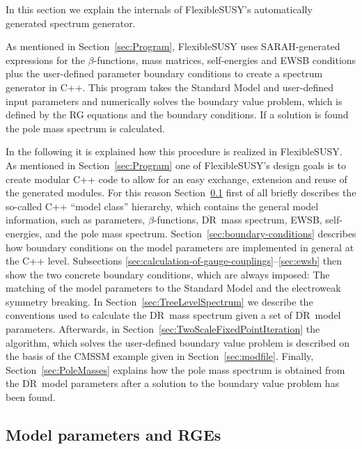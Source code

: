 \documentclass[final,3p,11pt,pdflatex]{elsarticle}
\makeatletter
\newcommand{\fs}{FlexibleSUSY\@\xspace}
\newcommand{\textoverline}[1]{$\overline{\mbox{#1}}$}
\newcommand{\DRbar}{\textoverline{DR}\xspace}
\newcommand{\secref}[1]{Section~\ref{#1}}
\makeatother
\begin{document}
In this section we explain the internals of \fs's automatically
generated spectrum generator.

As mentioned in \secref{sec:Program}, \fs uses SARAH-generated
expressions for the $\beta$-functions, mass matrices, self-energies
and EWSB conditions plus the user-defined parameter boundary
conditions to create a spectrum generator in C++.  This program takes
the Standard Model and user-defined input parameters and numerically
solves the boundary value problem, which is defined by the RG
equations and the boundary conditions.  If a solution is found the
pole mass spectrum is calculated.

In the following it is explained how this procedure is realized in
\fs.  As mentioned in \secref{sec:Program} one of \fs's design goals
is to create modular C++ code to allow for an easy exchange, extension
and reuse of the generated modules.  For this reason
\secref{sec:ModelParametersAndRGEs} first of all briefly describes the
so-called C++ ``model class'' hierarchy, which contains the general
model information, such as parameters, $\beta$-functions, \DRbar\ mass
spectrum, EWSB, self-energies, and the pole mass spectrum.
%
\secref{sec:boundary-conditions} describes how boundary conditions on
the model parameters are implemented in general at the C++ level.
Subsections \ref{sec:calculation-of-gauge-couplings}--\ref{sec:ewsb}
then show the two concrete boundary conditions, which are always
imposed: The matching of the model parameters to the Standard Model
and the electroweak symmetry breaking.
%
In \secref{sec:TreeLevelSpectrum} we describe the conventions used to
calculate the \DRbar\ mass spectrum given a set of \DRbar\ model
parameters.
%
Afterwards, in \secref{sec:TwoScaleFixedPointIteration} the algorithm,
which solves the user-defined boundary value problem is described on
the basis of the CMSSM example given in \secref{sec:modfile}.
%
Finally, \secref{sec:PoleMasses} explains how the pole mass spectrum
is obtained from the \DRbar\ model parameters after a solution to the
boundary value problem has been found.

\subsection{Model parameters and RGEs}
\label{sec:ModelParametersAndRGEs}
\end{document}
